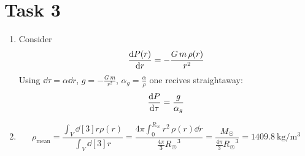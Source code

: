 \documentclass[11pt,a4paper]{scrartcl}
\newcommand{\Rsol}{\ensuremath{R_{\astrosun}}}
\newcommand{\Msol}{\ensuremath{M_{\astrosun}}}
\begin{document}
\section*{Task 3}

\begin{enumerate}[label=\textbf{\large(\alph*)}, itemsep=2\baselineskip]

\item
    Consider
    \begin{equation*}
        \dv{P(r)}{r} = -\frac{G\,m\,\rho(r)}{r^2}
    \end{equation*}
    Using $\dd\tau=\alpha\dd r$, $g=-\frac{G\,m}{r^2}$,
    $\alpha_g=\frac{\alpha}{\rho}$ one recives straightaway:
    \begin{equation*}
        \dv{P}{\tau} = \frac{g}{\alpha_g}
    \end{equation*}

\item
    \begin{equation*}
        \rho_{\textrm{mean}} = \frac{\int_V\dd[3]{r}\rho(r)}{\int_V\dd[3]{r}}
        = \frac{4\pi\int_0^{\Rsol} r^2\,\rho(r)\dd{r}}{\frac{4\pi}{3}\Rsol^3}
        = \frac{\Msol}{\frac{4\pi}{3}\Rsol^3}
        = \SI{1409.8}{\kilo\gram\per\metre\cubed}
    \end{equation*}

\end{enumerate}
\end{document}
